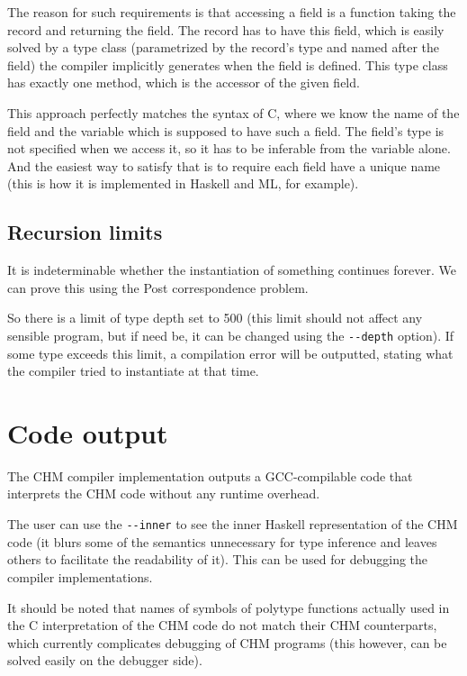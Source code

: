 The reason for such requirements is that accessing a field is a function taking the record and returning the field. The record has to have this field, which is easily solved by a type class (parametrized by the record's type and named after the field) the compiler implicitly generates when the field is defined. This type class has exactly one method, which is the accessor of the given field.

This approach perfectly matches the syntax of C, where we know the name of the field and the variable which is supposed to have such a field. The field's type is not specified when we access it, so it has to be inferable from the variable alone. And the easiest way to satisfy that is to require each field have a unique name (this is how it is implemented in Haskell and ML, for example).

\subsection{Recursion limits}

It is indeterminable whether the instantiation of something continues forever. We can prove this using the Post correspondence problem. %

So there is a limit of type depth set to 500 (this limit should not affect any sensible program, but if need be, it can be changed using the \lstinline[language=sh]{--depth} option). If some type exceeds this limit, a compilation error will be outputted, stating what the compiler tried to instantiate at that time.

\section{Code output}

The CHM compiler implementation outputs a GCC-compilable code that interprets the CHM code without any runtime overhead.

The user can use the \lstinline[language=sh]{--inner} to see the inner Haskell representation of the CHM code (it blurs some of the semantics unnecessary for type inference and leaves others to facilitate the readability of it). This can be used for debugging the compiler implementations.

It should be noted that names of symbols of polytype functions actually used in the C interpretation of the CHM code do not match their CHM counterparts, which currently complicates debugging of CHM programs (this however, can be solved easily on the debugger side).

